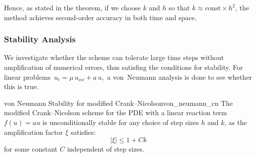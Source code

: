 Hence, as stated in the theorem, if we choose \(k\) and \(h\) so that \(k \approx \mathrm{const}\times h^2\),
the method achieves second-order accuracy in both time and space.

\subsubsection{Stability Analysis}

We investigate whether the scheme can tolerate large time steps without amplification of numerical errors, thus
satisfing the conditions for stability.
For linear problems
\(\,u_t = \mu\,u_{xx} + a\,u,\) a von~Neumann analysis is done to see whether
this is true.

\begin{theorem}{von Neumann Stability for modified Crank--Nicolson}{von_neumann_cn}
  The modified Crank--Nicolson scheme for the PDE with a linear reaction term $f(u) = au$ is unconditionally
  stable for any choice of step sizes $h$ and $k$, as the amplification factor $\xi$ satisfies:
  \[
    |\xi| \leq 1 + Ck
  \]
  for some constant $C$ independent of step sizes.
\end{theorem}

